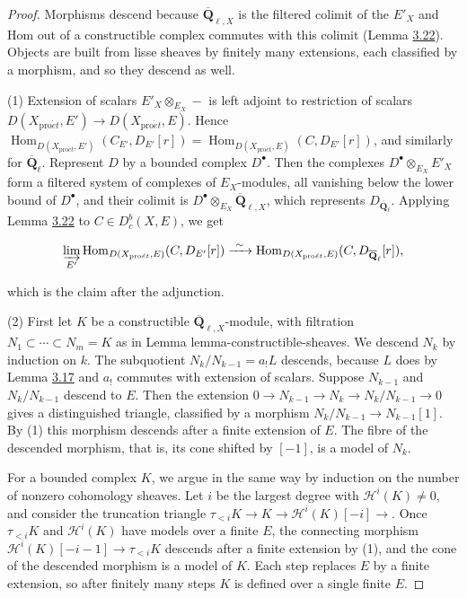 \documentclass[11pt]{article}
\providecommand{\Dbc}{}\renewcommand{\Dbc}{D^b_c}
\providecommand{\Hom}{}\renewcommand{\Hom}{\operatorname{Hom}}
\providecommand{\QbarX}{}\renewcommand{\QbarX}{\overline{\mathbf Q}_{\ell,X}}
\begin{document}
\begin{proof}[{Proof}]\label{bp266}%
Morphisms descend because \(\QbarX\) is the filtered colimit of the \(E'_X\) and Hom out of a constructible complex commutes with this colimit (Lemma \hyperref[bp260]{3.22}). Objects are built from lisse sheaves by finitely many extensions, each classified by a morphism, and so they descend as well.

(1) Extension of scalars \(E'_X\otimes_{E_X}-\) is left adjoint to restriction of scalars \(D(X_{\mathrm{pro}\acute{e}t},E')\to D(X_{\mathrm{pro}\acute{e}t},E)\). Hence \(\Hom_{D(X_{\mathrm{pro}\acute{e}t},E')}(C_{E'},D_{E'}[r])=\Hom_{D(X_{\mathrm{pro}\acute{e}t},E)}(C,D_{E'}[r])\), and similarly for \(\overline{\mathbf Q}_\ell\). Represent \(D\) by a bounded complex \(D^\bullet\). Then the complexes \(D^\bullet\otimes_{E_X}E'_X\) form a filtered system of complexes of \(E_X\)-modules, all vanishing below the lower bound of \(D^\bullet\), and their colimit is \(D^\bullet\otimes_{E_X}\QbarX\), which represents \(D_{\overline{\mathbf Q}_\ell}\). Applying Lemma \hyperref[bp260]{3.22} to \(C\in\Dbc(X,E)\), we get

\[
\varinjlim_{E'}\Hom_{D(X_{\mathrm{pro}\acute{e}t},E)}(C,D_{E'}[r])
\xrightarrow{\ \sim\ }\Hom_{D(X_{\mathrm{pro}\acute{e}t},E)}(C,D_{\overline{\mathbf Q}_\ell}[r]),
\]

which is the claim after the adjunction.

(2) First let \(K\) be a constructible \(\QbarX\)-module, with filtration \(N_1\subset\cdots\subset N_m=K\) as in Lemma lemma-constructible-sheaves. We descend \(N_k\) by induction on \(k\). The subquotient \(N_k/N_{k-1}=a_!L\) descends, because \(L\) does by Lemma \hyperref[bp245]{3.17} and \(a_!\) commutes with extension of scalars. Suppose \(N_{k-1}\) and \(N_k/N_{k-1}\) descend to \(E\). Then the extension \(0\to N_{k-1}\to N_k\to N_k/N_{k-1}\to0\) gives a distinguished triangle, classified by a morphism \(N_k/N_{k-1}\to N_{k-1}[1]\). By (1) this morphism descends after a finite extension of \(E\). The fibre of the descended morphism, that is, its cone shifted by \([-1]\), is a model of \(N_k\).

For a bounded complex \(K\), we argue in the same way by induction on the number of nonzero cohomology sheaves. Let \(i\) be the largest degree with \(\mathcal H^i(K)\neq0\), and consider the truncation triangle \(\tau_{<i}K\to K\to\mathcal H^i(K)[-i]\to\). Once \(\tau_{<i}K\) and \(\mathcal H^i(K)\) have models over a finite \(E\), the connecting morphism \(\mathcal H^i(K)[-i-1]\to\tau_{<i}K\) descends after a finite extension by (1), and the cone of the descended morphism is a model of \(K\). Each step replaces \(E\) by a finite extension, so after finitely many steps \(K\) is defined over a single finite \(E\).
\end{proof}
\end{document}
